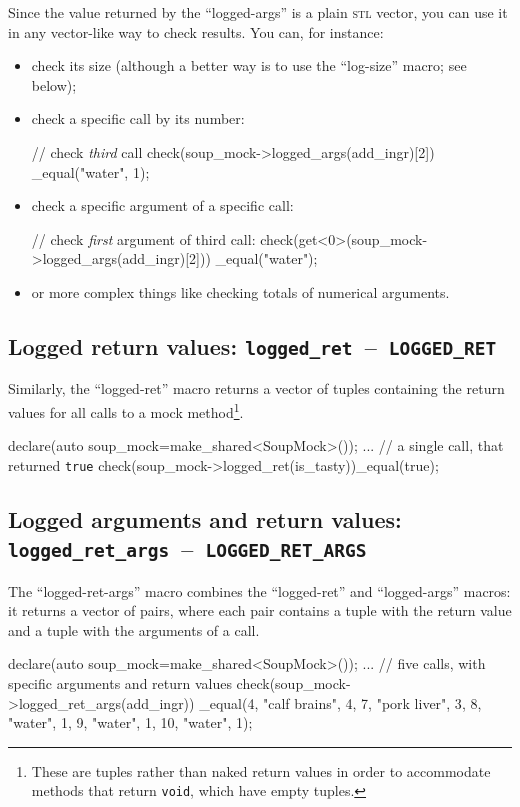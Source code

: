 \documentclass[twoside, a4paper, article]{memoir}
\newcommand*\testudocolor{\color{red!80!blue}}
\newcommand*\testudo[1]{\texttt{\testudocolor{}#1}}
\newcommand*\testudopair[2]{\testudo{#1}~--~\testudo{#2}}
\newcommand\subsectiontestudopair[3]{%
  \subsection[#1]{#1: \testudopair{#2}{#3}}}
\begin{document}
Since the value returned by the ``logged-args'' is a plain \textsc{stl} vector,
you can use it in any vector-like way to check results.  You can, for instance:
\begin{itemize}
\item check its size (although a better way is to use the ``log-size'' macro;
  see below);
\item check a specific call by its number:
\begin{cpplisting}
// check \emph{third} call
check(soup_mock->logged_args(add_ingr)[2])
  _equal({"water", 1});
\end{cpplisting}
\item check a specific argument of a specific call:
\begin{cpplisting}
// check \emph{first} argument of third call:
check(get<0>(soup_mock->logged_args(add_ingr)[2]))
  _equal("water");
\end{cpplisting}
\item or more complex things like checking totals of numerical arguments.
\end{itemize}

\subsectiontestudopair{Logged return values}{logged\_ret}{LOGGED\_RET}

Similarly, the ``logged-ret'' macro returns a vector of tuples containing the
return values for all calls to a mock method\footnote{These are tuples rather
  than naked return values in order to accommodate methods that return
  \texttt{void}, which have empty tuples.}.
\begin{cpplisting}
declare(auto soup_mock=make_shared<SoupMock>());
...
// a single call, that returned \texttt{true}
check(soup_mock->logged_ret(is_tasty))_equal({{true}});
\end{cpplisting}

\subsectiontestudopair{Logged arguments and return values}%
  {logged\_ret\_args}{LOGGED\_RET\_ARGS}

The ``logged-ret-args'' macro combines the ``logged-ret'' and ``logged-args''
macros: it returns a vector of pairs, where each pair contains a tuple with the
return value and a tuple with the arguments of a call.
\begin{cpplisting}
declare(auto soup_mock=make_shared<SoupMock>());
...
// five calls, with specific arguments and return values
check(soup_mock->logged_ret_args(add_ingr))
  _equal({{{4}, {"calf brains", 4}},
          {{7}, {"pork liver", 3}},
          {{8}, {"water", 1}},
          {{9}, {"water", 1}},
          {{10}, {"water", 1}}});
\end{cpplisting}
\end{document}
